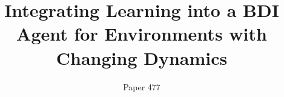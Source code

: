 \documentclass{article}
\title{Integrating Learning into a BDI Agent for Environments with Changing Dynamics}
\author{
Paper 477
}
\begin{document}
\maketitle

\begin{abstract}

\end{abstract}









\small


\end{document}
